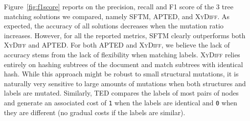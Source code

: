 Figure~\ref{fig:f1score} reports on the precision, recall and F1 score of the 3 tree matching solutions we compared, namely SFTM, APTED, and \textsc{XyDiff}.
As expected, the accuracy of all solutions decreases when the mutation ratio increases.
However, for all the reported metrics, SFTM clearly outperforms both \textsc{XyDiff} and APTED.
For both APTED and \textsc{XyDiff}, we believe the lack of accuracy stems from the lack of flexibility when matching labels.
\textsc{XyDiff} relies entirely on hashing subtrees of the document and match subtrees with identical hash.
While this approach might be robust to small structural mutations, it is naturally very sensitive to large amounts of mutations when both structures and labels are mutated.
Similarly, TED compares the labels of most pairs of nodes and generate an associated cost of \texttt{1} when the labels are identical and \texttt{0} when they are different (no gradual costs if the labels are similar).

